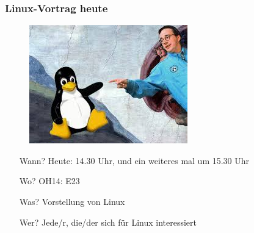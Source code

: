 \documentclass{beamer}
\begin{document}
\begin{frame}
\frametitle{Linux-Vortrag heute}
\begin{figure}
\includegraphics[scale=0.7]{tuxlinus.jpeg}
\end{figure}
\begin{itemize}
		\item[Wann?] Heute: 14.30 Uhr, und ein weiteres mal um 15.30 Uhr
		\item[Wo?] OH14: E23
		\item[Was?] Vorstellung von Linux
		\item[Wer?] Jede/r, die/der sich für Linux interessiert
\end{itemize}
\end{frame}
\end{document}
